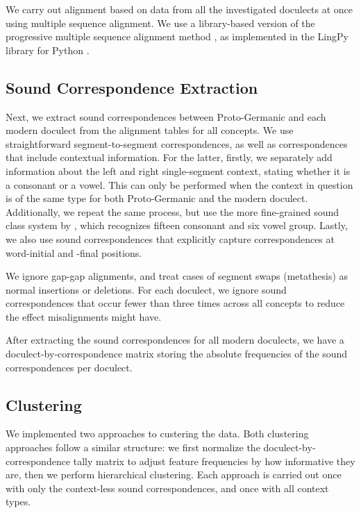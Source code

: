 \documentclass[a4paper, 11pt]{article}
\begin{document}
We carry out alignment based on data from
all the investigated doculects at once using multiple sequence alignment.
We use a library-based version \citep{notredame2000t-coffee:} of the progressive multiple sequence alignment method \citep{thompson1994clustal}, as implemented in the LingPy library for Python \citep{list2018lingpy}.

\subsection{Sound Correspondence Extraction}

Next, we extract sound correspondences between
Proto-Germanic and each modern doculect from the alignment tables for all concepts.
We use straightforward segment-to-segment correspondences,
as well as correspondences that include contextual information.
For the latter, firstly, we separately add information about the
left and right single-segment context,
stating whether it is a consonant or a vowel.
This can only be performed when the context in question is of
the same type for both Proto-Germanic and the modern doculect.
Additionally, we repeat the same process, but use the more fine-grained sound class system by \citet{list2012sca}, which recognizes fifteen consonant and six vowel group.
Lastly, we also use sound correspondences that explicitly capture correspondences at word-initial and -final positions.

We ignore gap-gap alignments,
and treat cases of segment swaps (metathesis) as normal insertions or deletions.
For each doculect, we ignore sound correspondences
that occur fewer than three times across all concepts
to reduce the effect misalignments might have. 

After extracting the sound correspondences for
all modern doculects, we have a doculect-by-correspondence
matrix storing the absolute frequencies of the sound correspondences per doculect.

\subsection{Clustering}

We implemented two approaches to custering the data.
Both clustering approaches follow a similar structure:
we first normalize the doculect-by-correspondence tally matrix
to adjust feature frequencies by how informative they are,
then we perform hierarchical clustering.
Each approach is carried out once with only
the context-less sound correspondences,
and once with all context types.
\end{document}
